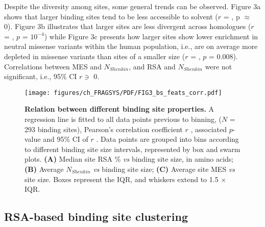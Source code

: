 Despite the diversity among sites, some general trends can be observed. Figure 3a shows that larger binding sites tend to be less accessible to solvent ($r$ = , p $\approx$ 0). Figure 3b illustrates that larger sites are less divergent across homologues ($r$ = , $p$ = $10^{-4}$) while Figure 3c presents how larger sites show lower enrichment in neutral missense variants within the human population, i.e., are on average more depleted in missense variants than sites of a smaller size ($r$ = , $p$ = 0.008). Correlations between MES and $N_{Shenkin}$, and RSA and $N_{Shenkin}$ were not significant, i.e., 95\% CI $r \ni$ 0.

\begin{figure}[htbp]
    \centering
    \texttt{[image: figures/ch\_FRAGSYS/PDF/FIG3\_bs\_feats\_corr.pdf]}
    \caption[Relation between different binding site properties]{\textbf{Relation between different binding site properties.} A regression line is fitted to all data points previous to binning, ($N$ = 293 binding sites), Pearson’s correlation coefficient $r$ \cite{RODGERS_1988_CORRELATION}, associated $p$-value and 95\% CI of $r$ \cite{BOWLEY_1928_R_CI}. Data points are grouped into bins according to different binding site size intervals, represented by box and swarm plots. \textbf{(A)} Median site RSA \% \textit{vs} binding site size, in amino acids; \textbf{(B)} Average $N_{Shenkin}$ \textit{vs} binding site size; \textbf{(C)} Average site MES \textit{vs} site size. Boxes represent the IQR, and whiskers extend to 1.5 $\times$ IQR.}
    \label{fig:bss_feats_corr}
\end{figure}

\subsection{RSA-based binding site clustering}


